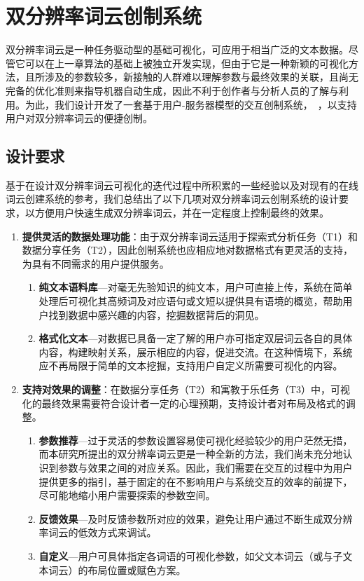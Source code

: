 \chapter{双分辨率词云创制系统}
\label{sec:system}
双分辨率词云是一种任务驱动型的基础可视化，可应用于相当广泛的文本数据。尽管它可以在上一章算法的基础上被独立开发实现，但由于它是一种新颖的可视化方法，且所涉及的参数较多，新接触的人群难以理解参数与最终效果的关联，且尚无完备的优化准则来指导机器自动生成，因此不利于创作者与分析人员的了解与利用。为此，我们设计开发了一套基于用户-服务器模型的交互创制系统，~\toolname{}，以支持用户对双分辨率词云的便捷创制。

\section{设计要求}
基于在设计双分辨率词云可视化的迭代过程中所积累的一些经验以及对现有的在线词云创建系统的参考，我们总结出了以下几项对双分辨率词云创制系统的设计要求，以方便用户快速生成双分辨率词云，并在一定程度上控制最终的效果。

\begin{enumerate}[leftmargin=*]
	\renewcommand{\labelenumi}{\textbf{D\theenumi.}}
	\renewcommand{\labelenumii}{\textbf{D\theenumi.\arabic{enumii}}}
	\item \textbf{提供灵活的数据处理功能}：由于双分辨率词云适用于探索式分析任务（T1）和数据分享任务（T2），因此创制系统也应相应地对数据格式有更灵活的支持，为具有不同需求的用户提供服务。
	\begin{enumerate}
		\item \textbf{纯文本语料库}---对毫无先验知识的纯文本，用户可直接上传，系统在简单处理后可视化其高频词及对应语句或文短以提供具有语境的概览，帮助用户找到数据中感兴趣的内容，挖掘数据背后的洞见。
		\item \textbf{格式化文本}---对数据已具备一定了解的用户亦可指定双层词云各自的具体内容，构建映射关系，展示相应的内容，促进交流。在这种情境下，系统应不再局限于简单的文本挖掘，支持用户自定义所需要可视化的内容。
	\end{enumerate}
	\item \textbf{支持对效果的调整}：在数据分享任务（T2）和寓教于乐任务（T3）中，可视化的最终效果需要符合设计者一定的心理预期，支持设计者对布局及格式的调整。
		\begin{enumerate}
		\item \textbf{参数推荐}---过于灵活的参数设置容易使可视化经验较少的用户茫然无措，而本研究所提出的双分辨率词云更是一种全新的方法，我们尚未充分地认识到参数与效果之间的对应关系。因此，我们需要在交互的过程中为用户提供更多的指引，基于固定的在不影响用户与系统交互的效率的前提下，尽可能地缩小用户需要探索的参数空间。
		\item \textbf{反馈效果}---及时反馈参数所对应的效果，避免让用户通过不断生成双分辨率词云的低效方式来调试。
		\item \textbf{自定义}---用户可具体指定各词语的可视化参数，如父文本词云（或与子文本词云）的布局位置或赋色方案。
	\end{enumerate}
\end{enumerate}


